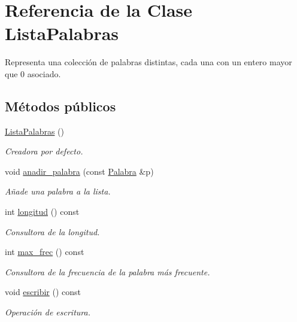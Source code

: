 \hypertarget{class_lista_palabras}{\section{Referencia de la Clase Lista\-Palabras}
\label{class_lista_palabras}
}


Representa una colección de palabras distintas, cada una con un entero mayor que 0 asociado.  


\subsection*{Métodos públicos}
\begin{DoxyCompactItemize}
\item 
\hyperlink{class_lista_palabras_ae0d9e5a9aa149270056f47d272f36460}{Lista\-Palabras} ()
\begin{DoxyCompactList}\small\item\em Creadora por defecto. \end{DoxyCompactList}\item 
void \hyperlink{class_lista_palabras_a1321849c60c36bd29208103984a37192}{anadir\-\_\-palabra} (const \hyperlink{class_palabra}{Palabra} \&p)
\begin{DoxyCompactList}\small\item\em Añade una palabra a la lista. \end{DoxyCompactList}\item 
int \hyperlink{class_lista_palabras_ad593a5988b7ec974e9621e8cd26e0e06}{longitud} () const 
\begin{DoxyCompactList}\small\item\em Consultora de la longitud. \end{DoxyCompactList}\item 
int \hyperlink{class_lista_palabras_aaafa09ef438a8ee956d2c1a095e578f4}{max\-\_\-frec} () const 
\begin{DoxyCompactList}\small\item\em Consultora de la frecuencia de la palabra más frecuente. \end{DoxyCompactList}\item 
void \hyperlink{class_lista_palabras_a187f5be7e249f31279e2445115b32dd1}{escribir} () const 
\begin{DoxyCompactList}\small\item\em Operación de escritura. \end{DoxyCompactList}\end{DoxyCompactItemize}
